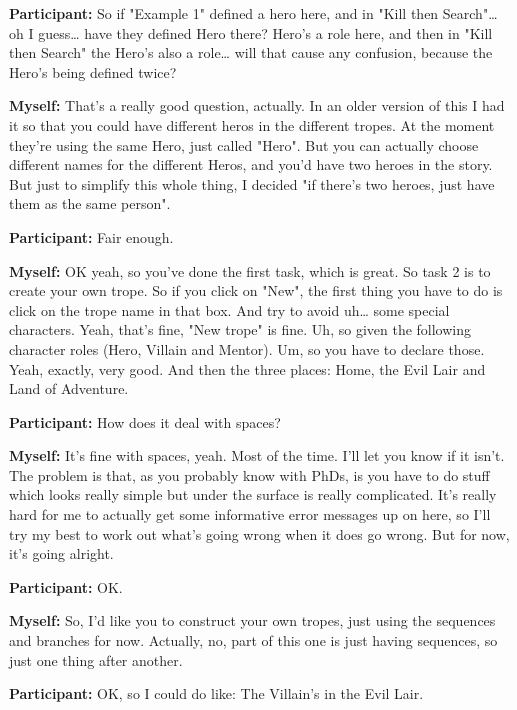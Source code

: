 \documentclass[11pt]{report}
\newcommand{\llabel}[1]{\hypertarget{llineno:#1}{\linelabel{#1}}}
\begin{document}

\begin{linenumbers}
\textbf{Participant:} So if "Example 1" defined a hero here, and in "Kill then
Search"\ldots{} oh I guess\ldots{} have they defined Hero there? Hero's a role
here, and then in "Kill then Search" the Hero's also a role\ldots{} will that
cause any confusion, because the Hero's being defined twice?\llabel{lne:feature1a}

\textbf{Myself:} That's a really good question, actually. In an older version of this I had it so that you could have different heros in the different tropes. At the moment they're using the same Hero, just called "Hero". But you can actually choose different names for the different Heros, and you'd have two heroes in the story. But just to simplify this whole thing, I decided "if there's two heroes, just have them as the same person".

\textbf{Participant:} Fair enough.

\textbf{Myself:} OK yeah, so you've done the first task, which is great. So task 2 is to create your own trope. So if you click on "New", the first thing you have to do is click on the trope name in that box. And try to avoid uh\ldots{} some special characters. Yeah, that's fine, "New trope" is fine. Uh, so given the following character roles (Hero, Villain and Mentor). Um, so you have to declare those. Yeah, exactly, very good. And then the three places: Home, the Evil Lair and Land of Adventure.

\textbf{Participant:} How does it deal with spaces?\llabel{lne:syntax1a}

\textbf{Myself:} It's fine with spaces, yeah. Most of the time. I'll let you know if it isn't. The problem is that, as you probably know with PhDs, is you have to do stuff which looks really simple but under the surface is really complicated. It's really hard for me to actually get some informative error messages up on here, so I'll try my best to work out what's going wrong when it does go wrong. But for now, it's going alright.

\textbf{Participant:} OK.

\textbf{Myself:} So, I'd like you to construct your own tropes, just using the sequences and branches for now. Actually, no, part of this one is just having sequences, so just one thing after another.

\textbf{Participant:} OK, so I could do like: The Villain's in the Evil
Lair.\llabel{lne:feature2a}


\end{linenumbers}
\end{document}
